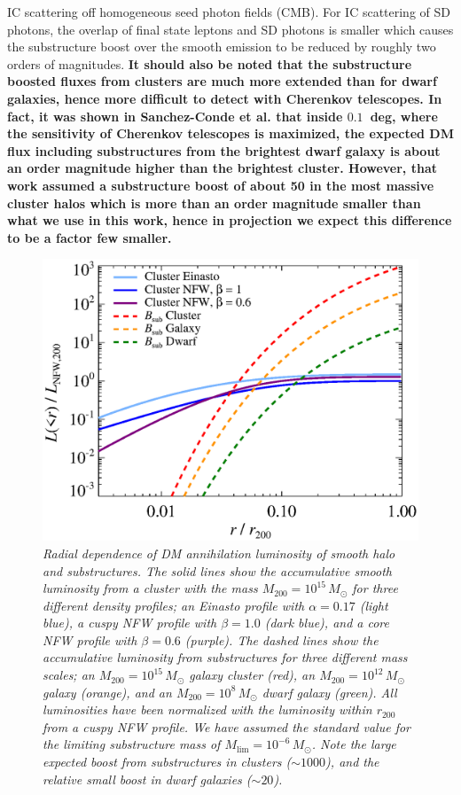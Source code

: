 \documentclass[10pt,aps,pra,reprint,amsmath,amsfonts,amssymb,showpacs,nofootinbib,floatfix]{revtex4-1}
\def\C#1{{\bf #1}}
\newcommand{\rmn}{\mathrm}
\newcommand{\msun}{M_\odot}
\newcommand{\rvir}{r_{200}}
\newcommand{\mvir}{M_{200}}
\begin{document}
IC scattering off homogeneous seed photon fields (CMB). For IC
scattering of SD photons, the overlap of final state leptons and SD
photons is smaller which causes the substructure boost over the smooth
emission to be reduced by roughly two orders of magnitudes. \C{It
  should also be noted that the substructure boosted fluxes from
  clusters are much more extended than for dwarf galaxies, hence more
  difficult to detect with Cherenkov telescopes. In fact, it was shown
  in Sanchez-Conde et al. \cite{2011arXiv1104.3530S} that inside
  $0.1$~deg, where the sensitivity of Cherenkov telescopes is
  maximized, the expected DM flux including substructures from the
  brightest dwarf galaxy is about an order magnitude higher than the
  brightest cluster. However, that work assumed a substructure boost
  of about 50 in the most massive cluster halos which is more than an
  order magnitude smaller than what we use in this work, hence in
  projection we expect this difference to be a factor few smaller.}

\begin{figure}%
 \includegraphics[width=0.99\columnwidth]{figures/dens.prof.eps}
 \caption{\it Radial dependence of DM annihilation luminosity of
   smooth halo and substructures. The solid lines show the
   accumulative smooth luminosity from a cluster with the mass
   $\mvir=10^{15}\,\msun$ for three different density profiles; an
   Einasto profile with $\alpha=0.17$ (light blue), a cuspy NFW
   profile with $\beta=1.0$ (dark blue), and a core NFW profile with
   $\beta=0.6$ (purple). The dashed lines show the accumulative
   luminosity from substructures for three different mass scales; an
   $\mvir=10^{15}\,\msun$ galaxy cluster (red), an
   $\mvir=10^{12}\,\msun$ galaxy (orange), and an
   $\mvir=10^{8}\,\msun$ dwarf galaxy (green). All luminosities have
   been normalized with the luminosity within $\rvir$ from a cuspy NFW
   profile. We have assumed the standard value for the limiting
   substructure mass of $M_\rmn{lim}=10^{-6}\,\msun$. Note the large
   expected boost from substructures in clusters ($\sim1000$), and the
   relative small boost in dwarf galaxies ($\sim20$).}
 \label{fig:radial_lum}
\end{figure}
\end{document}
